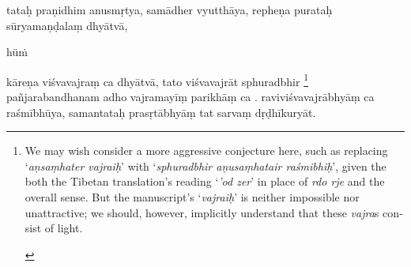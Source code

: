 \documentclass[naipra.tex]{subfiles}
\begin{document}
\begin{sanskrit}

\pstart
tataḥ praṇidhim anusmṛtya, samādher vyutthāya, repheṇa purataḥ sūryamaṇḍalaṃ dhyātvā,  \begin{mantra}hūṁ\end{mantra}\dsh kāreṇa viśvavajraṃ ca dhyātvā, tato viśvavajrāt sphuradbhir \footnote{\begin{english}
	We may wish consider a more aggressive conjecture here, such as replacing `\emph{aṇsaṃhater vajraiḥ}' with `\emph{sphuradbhir aṇusaṃhatair raśmibhiḥ}', given the both the Tibetan translation's reading `\emph{'od zer}' in place of \emph{rdo rje} and the overall sense.
	But the manuscript's `\emph{vajraiḥ}' is neither impossible nor unattractive; we should, however, implicitly understand that these \emph{vajra}s consist of light.
\end{english}}  pañjarabandhanam adho vajramayīṃ  parikhāṃ ca .
raviviśvavajrābhyāṃ ca raśmībhūya, samantataḥ prasṛtābhyāṃ tat sarvaṃ dṛḍhīkuryāt.
\pend




\end{sanskrit}
\end{document}
